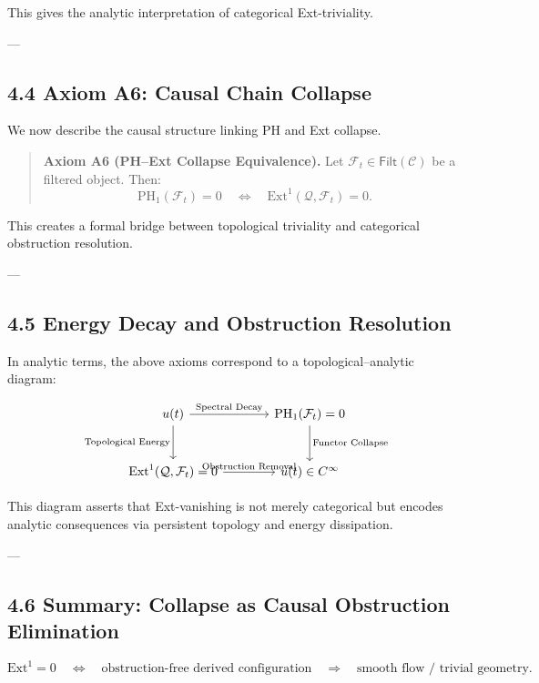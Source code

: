 \documentclass[11pt]{article}
\begin{document}
This gives the analytic interpretation of categorical Ext-triviality.

---

\subsection*{4.4 Axiom A6: Causal Chain Collapse}

We now describe the causal structure linking PH and Ext collapse.

\begin{quote}
\textbf{Axiom A6 (PH–Ext Collapse Equivalence).}  
Let \( \mathcal{F}_t \in \mathsf{Filt}(\mathcal{C}) \) be a filtered object. Then:
\[
\mathrm{PH}_1(\mathcal{F}_t) = 0 
\quad \Longleftrightarrow \quad 
\mathrm{Ext}^1(\mathcal{Q}, \mathcal{F}_t) = 0.
\]
\end{quote}

This creates a formal bridge between topological triviality and categorical obstruction resolution.

---

\subsection*{4.5 Energy Decay and Obstruction Resolution}

In analytic terms, the above axioms correspond to a topological–analytic diagram:

\[
\begin{tikzcd}[column sep=large, row sep=large]
u(t) \arrow[r, "\text{Spectral Decay}"] \arrow[d, swap, "\text{Topological Energy}"]
& \mathrm{PH}_1(\mathcal{F}_t) = 0 \arrow[d, "\text{Functor Collapse}"] \\
\mathrm{Ext}^1(\mathcal{Q}, \mathcal{F}_t) = 0 \arrow[r, "\text{Obstruction Removal}"]
& u(t) \in C^\infty
\end{tikzcd}
\]

This diagram asserts that Ext-vanishing is not merely categorical but encodes analytic consequences  
via persistent topology and energy dissipation.

---

\subsection*{4.6 Summary: Collapse as Causal Obstruction Elimination}

\[
\mathrm{Ext}^1 = 0 
\quad \Longleftrightarrow \quad 
\text{obstruction-free derived configuration} 
\quad \Rightarrow \quad 
\text{smooth flow / trivial geometry}.
\]
\end{document}
